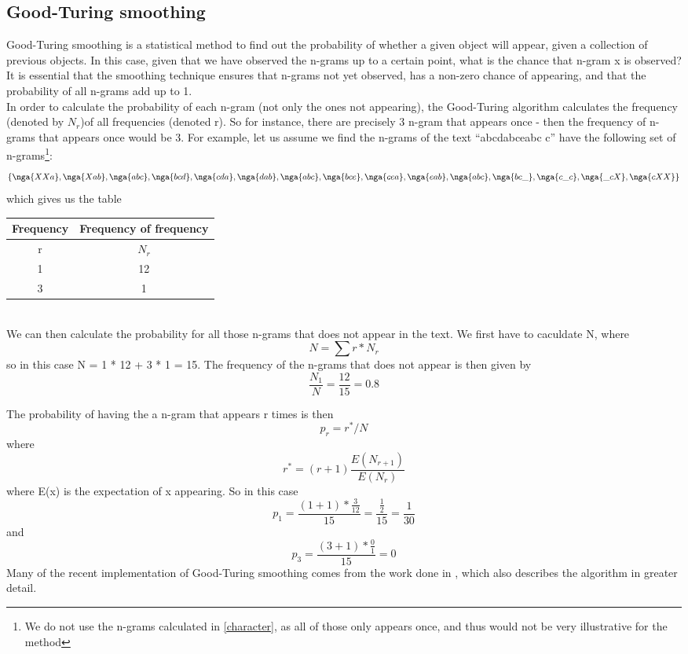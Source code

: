 \subsection{Good-Turing smoothing}
\label{Good-Turing}
Good-Turing smoothing is a statistical method to find out the probability of whether a given object will appear, given a collection of previous objects. In this case, given that we have observed the n-grams up to a certain point, what is the chance that n-gram x is observed? It is essential that the smoothing technique ensures that n-grams not yet observed, has a non-zero chance of appearing, and that the probability of all n-grams add up to 1.\\

In order to calculate the probability of each n-gram (not only the ones not appearing), the Good-Turing algorithm calculates the frequency (denoted by $N_r$)of all frequencies (denoted r). So for instance, there are precisely 3 n-gram that appears once - then the frequency of n-grams that appears once would be 3. For example, let us assume we find the n-grams of the text ``abcdabceabc c'' have the following set of n-grams\footnote{We do not use the n-grams calculated in \ref{character}, as all of those only appears once, and thus would not be very illustrative for the method}:\\
$$
\{\nga{XXa}, \nga{Xab}, \nga{abc}, \nga{bcd}, \nga{cda}, \nga{dab}, \nga{abc}, \nga{bce}, \nga{cea}, \nga{eab}, \nga{abc}, \nga{bc\_}, \nga{c\_c}, \nga{\_cX}, \nga{cXX} \}
$$
which gives us the table\\
\begin{tabular}{|cc|}
\hline
Frequency & Frequency of frequency \\
\hline
r & $N_{r}$ \\
1 & 12\\
3 & 1\\
\hline
\end{tabular}
\\
We can then calculate the probability for all those n-grams that does not appear in the text. We first have to caculdate N, where 
$$
N = \sum r * N_r
$$
so in this case N = 1 * 12 + 3 * 1 = 15. The frequency of the n-grams that does not appear is then given by 
$$
\frac{N_1}{N} = \frac{12}{15} = 0.8
$$

The probability of having the a n-gram that appears r times is then 
$$p_r = r^*/N$$
 where 
$$r^* = (r+1)\frac{E(N_{r+1})}{E(N_r)}$$
 where E(x) is the expectation of x appearing. So in this case 
$$p_1 = \frac{(1 + 1) * \frac{3}{12}}{15} = \frac{\frac{1}{2}}{15} = \frac{1}{30}$$ and  
$$p_3 = \frac{(3 + 1) * \frac{0}{1}}{15} = 0$$
Many of the recent implementation of Good-Turing smoothing comes from the work done in \cite{Gale94good-turingsmoothing}, which also describes the algorithm in greater detail.

